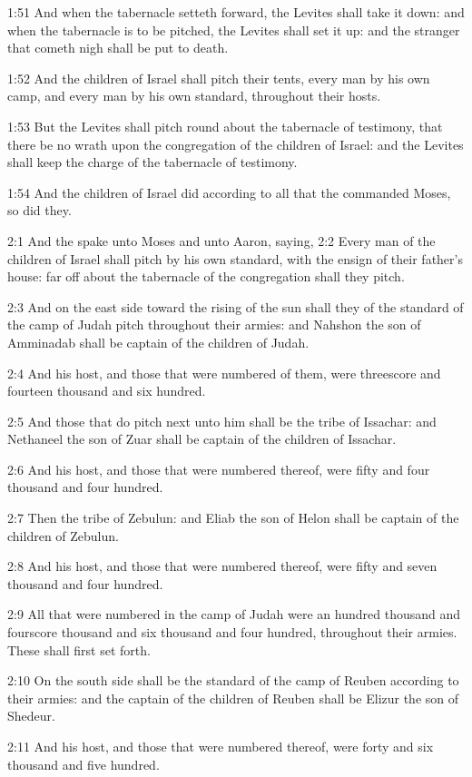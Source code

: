 1:51 And when the tabernacle setteth forward, the Levites shall take
it down: and when the tabernacle is to be pitched, the Levites shall
set it up: and the stranger that cometh nigh shall be put to death.

1:52 And the children of Israel shall pitch their tents, every man by
his own camp, and every man by his own standard, throughout their
hosts.

1:53 But the Levites shall pitch round about the tabernacle of
testimony, that there be no wrath upon the congregation of the
children of Israel: and the Levites shall keep the charge of the
tabernacle of testimony.

1:54 And the children of Israel did according to all that the \LORD
commanded Moses, so did they.

2:1 And the \LORD spake unto Moses and unto Aaron, saying, 2:2 Every
man of the children of Israel shall pitch by his own standard, with
the ensign of their father's house: far off about the tabernacle of
the congregation shall they pitch.

2:3 And on the east side toward the rising of the sun shall they of
the standard of the camp of Judah pitch throughout their armies: and
Nahshon the son of Amminadab shall be captain of the children of
Judah.

2:4 And his host, and those that were numbered of them, were
threescore and fourteen thousand and six hundred.

2:5 And those that do pitch next unto him shall be the tribe of
Issachar: and Nethaneel the son of Zuar shall be captain of the
children of Issachar.

2:6 And his host, and those that were numbered thereof, were fifty and
four thousand and four hundred.

2:7 Then the tribe of Zebulun: and Eliab the son of Helon shall be
captain of the children of Zebulun.

2:8 And his host, and those that were numbered thereof, were fifty and
seven thousand and four hundred.

2:9 All that were numbered in the camp of Judah were an hundred
thousand and fourscore thousand and six thousand and four hundred,
throughout their armies. These shall first set forth.

2:10 On the south side shall be the standard of the camp of Reuben
according to their armies: and the captain of the children of Reuben
shall be Elizur the son of Shedeur.

2:11 And his host, and those that were numbered thereof, were forty
and six thousand and five hundred.

